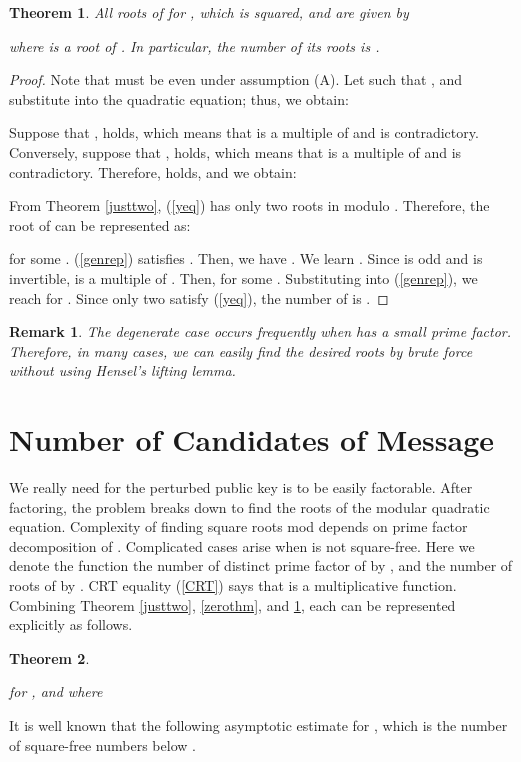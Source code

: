\documentclass{article}
\newtheorem{thm}{Theorem}
\newtheorem{rem}{Remark}
\begin{document}
\begin{thm}\label{nonzerothm}
All roots of 
 for , 
which is squared, and  are given by 

where  is a root of . 
In particular, the number of its roots is .
\end{thm}
\begin{proof}
Note that  must be even under assumption (A).
Let  such that , and substitute  into the quadratic equation; thus, we obtain:

Suppose that ,  holds, 
which means that  is a multiple of  and is contradictory. 
Conversely, suppose that ,  holds, 
which means that  is a multiple of  and is contradictory. 
Therefore,  holds, and we obtain:

From Theorem \ref{justtwo}, (\ref{yeq}) has only two roots in modulo . 
Therefore, the root  of  can be represented as: 

for some . 
(\ref{genrep}) satisfies . Then, we have 
. 
We learn . Since  is odd and  is invertible, 
 is a multiple of . Then,  for some .
Substituting  into (\ref{genrep}), we reach 
 for . 
Since only two  satisfy (\ref{yeq}), the number of  is .
\end{proof}

\begin{rem}
The degenerate case occurs frequently when  has a small prime factor.
Therefore, in many cases, we can easily find the desired roots by 
brute force without using Hensel's lifting lemma.
\end{rem}

\section{Number of Candidates of Message}\label{NUM}
We really need for the perturbed public key  is to be easily factorable. 
After factoring, the problem breaks down to find the roots of the modular 
quadratic equation. 
Complexity of finding square roots mod  depends on prime factor decomposition of . 
Complicated cases arise when  is not square-free. 
Here we denote the function the number of distinct prime factor of  by , 
and the number of roots of  by . 
CRT equality (\ref{CRT}) says that  is a multiplicative function. 
Combining Theorem \ref{justtwo}, \ref{zerothm}, and \ref{nonzerothm}, each  can be represented explicitly 
as follows.

\begin{thm}\label{th:numberofroots}

for , and where 

\end{thm}
It is well known that the following asymptotic estimate for 
, which is the number of square-free numbers below .
\end{document}
